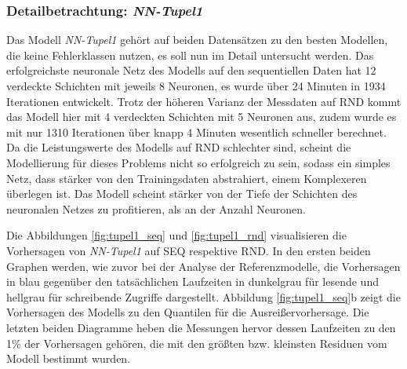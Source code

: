 \documentclass[
	12pt,
	a4paper,
	BCOR10mm,
	DIV14,
	listof=totoc,
	bibliography=totoc,
	headsepline
]{scrreprt}
\begin{document}
\subsubsection{Detailbetrachtung: \textit{NN-Tupel1}}
Das Modell \textit{NN-Tupel1} gehört auf beiden Datensätzen zu den besten Modellen, die keine Fehlerklassen nutzen, es soll nun im Detail untersucht werden.
Das erfolgreichste neuronale Netz des Modells auf den sequentiellen Daten hat 12 verdeckte Schichten mit jeweils 8 Neuronen, es wurde über 24 Minuten in 1934 Iterationen entwickelt.
Trotz der höheren Varianz der Messdaten auf RND kommt das Modell hier mit 4 verdeckten Schichten mit 5 Neuronen aus, zudem wurde es mit nur 1310 Iterationen über knapp 4 Minuten wesentlich schneller berechnet.
Da die Leistungswerte des Modells auf RND schlechter sind, scheint die Modellierung für dieses Problems nicht so erfolgreich zu sein, sodass ein simples Netz, dass stärker von den Trainingsdaten abstrahiert, einem Komplexeren überlegen ist.
Das Modell scheint stärker von der Tiefe der Schichten des neuronalen Netzes zu profitieren, als an der Anzahl Neuronen.\medskip

Die Abbildungen \ref{fig:tupel1_seq} und \ref{fig:tupel1_rnd} visualisieren die Vorhersagen von \textit{NN-Tupel1} auf SEQ respektive RND.
In den ersten beiden Graphen werden, wie zuvor bei der Analyse der Referenzmodelle, die Vorhersagen in blau gegenüber den tatsächlichen Laufzeiten in dunkelgrau für lesende und hellgrau für schreibende Zugriffe dargestellt.
Abbildung \ref{fig:tupel1_seq}b zeigt die Vorhersagen des Modells zu den Quantilen für die Ausreißervorhersage.
Die letzten beiden Diagramme heben die Messungen hervor dessen Laufzeiten zu den 1\% der Vorhersagen gehören, die mit den größten bzw. kleinsten Residuen vom Modell bestimmt wurden.\medskip
\end{document}
